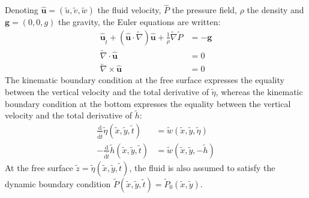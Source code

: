 \documentclass[11pt,a4paper]{article}
\begin{document}
	Denoting $\mathbf{\hat{u}} = (\tilde{u},\tilde{v}, \tilde{w})$ the fluid velocity, $\hat{P}$ the pressure field, $\rho$ the density and $\mathbf{g} = (0,0,g)$ the gravity, the Euler equations are written: 
	\begin{align}
		\displaystyle \mathbf{\hat{u}}_{\tilde{t}} + (\mathbf{\hat{u}} \cdot \tilde{\nabla}) \mathbf{\hat{u}} + \frac{1}{\rho} \tilde{\nabla}\tilde{P} &=  -\mathbf{g} \label{Euler1} \\
		\tilde{\nabla} \cdot \mathbf{\hat{u}} & = 0 \\
		\tilde{\nabla} \times \mathbf{\hat{u}} & = 0 \label{Euler3}
	\end{align}
	The kinematic boundary condition at the free surface expresses the equality between the vertical velocity and the total derivative of $\tilde{\eta}$, whereas the kinematic boundary condition at the bottom expresses the equality between the vertical velocity and the total derivative of $\tilde{h}$:
	\begin{align}
		\frac{\mathrm{d}}{\mathrm{d}\tilde{t}} \tilde{\eta}(\tilde{x},\tilde{y},\tilde{t}) & = \tilde{w}(\tilde{x},\tilde{y},\tilde{\eta}) \label{BC1} \\
		-\frac{\mathrm{d}}{\mathrm{d}\tilde{t}} \tilde{h}(\tilde{x},\tilde{y},\tilde{t}) & = \tilde{w}(\tilde{x},\tilde{y},-\tilde{h}) \label{BC2}
	\end{align}
	At the free surface $\tilde{z} = \tilde{\eta}(\tilde{x},\tilde{y},\tilde{t})$,	the fluid is also assumed to satisfy the dynamic boundary condition $\tilde{P}(\tilde{x},\tilde{y},\tilde{t}) = \tilde{P}_0(\tilde{x},\tilde{y})$.
			
\end{document}
